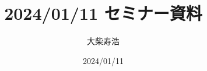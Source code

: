 \theoremstyle{mystyle}
\newtheorem{AXM}{公理}[section]
\newtheorem{DFN}[AXM]{定義}
\newtheorem{THM}[AXM]{定理}
\newtheorem*{THM*}{定理}
\newtheorem{PRP}[AXM]{命題}
\newtheorem{LMM}[AXM]{補題}
\newtheorem{CRL}[AXM]{系}
\newtheorem{EG}[AXM]{例}
\newtheorem*{EG*}{例}
\newtheorem{CNV}[AXM]{規約}
\newtheorem{CMT}[AXM]{コメント}



\usepackage{framed}
\renewenvironment{leftbar}{%
  \def\FrameCommand{\textcolor{lightgray}{\vrule width 0.7zw} \hspace{10pt}}%
  \MakeFramed {\advance\hsize-\width \FrameRestore}}%
{\endMakeFramed}
\newenvironment{redleftbar}{%
  \def\FrameCommand{\textcolor{lightgray}{\vrule width 1pt} \hspace{10pt}}%
  \MakeFramed {\advance\hsize-\width \FrameRestore}}%
 {\endMakeFramed}








\def\inner<#1>{\langle #1 \rangle}








\title{2024/01/11 セミナー資料}
\author{大柴寿浩}
\date{2024/01/11}

\maketitle
